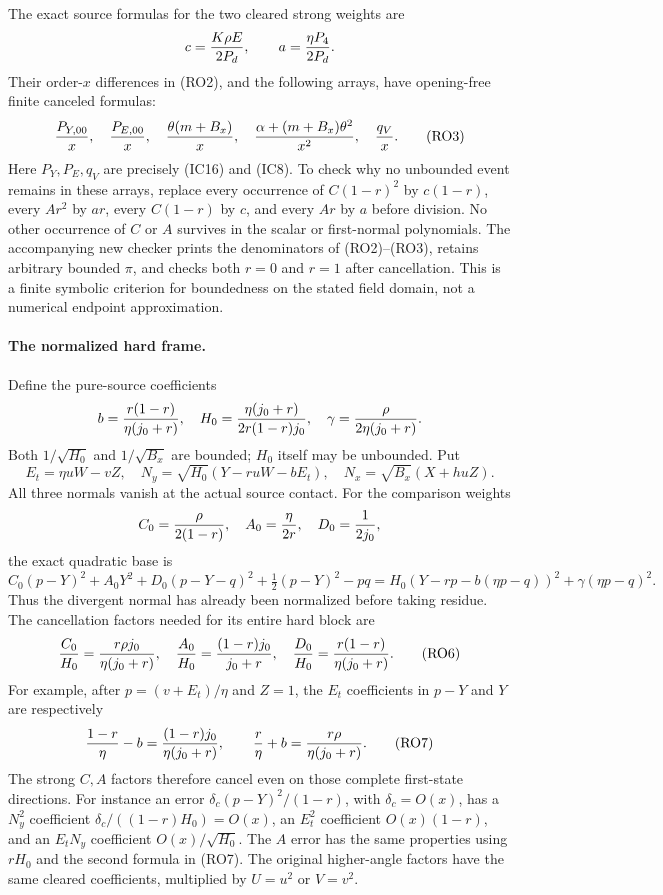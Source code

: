 The exact source formulas for the two cleared strong weights are
\[
 c={K\rho E\over2P_d},\qquad a={\eta P_4\over2P_d}.
\]
Their order-$x$ differences in (RO2), and the following arrays, have
opening-free finite canceled formulas:
\[
 {P_{Y,00}\over x},\quad {P_{E,00}\over x},\quad
 {\theta(m+B_x)\over x},\quad
 {\alpha+(m+B_x)\theta^2\over x^2},\quad {q_V\over x}.
                                                               \tag{RO3}
\]
Here $P_Y,P_E,q_V$ are precisely (IC16) and (IC8). To check why no
unbounded event remains in these arrays, replace every occurrence of
$C(1-r)^2$ by $c(1-r)$, every $Ar^2$ by $ar$, every
$C(1-r)$ by $c$, and every $Ar$ by $a$ before division. No other
occurrence of $C$ or $A$ survives in the scalar or first-normal
polynomials. The accompanying new checker prints the denominators of
(RO2)--(RO3), retains arbitrary bounded $\pi$, and checks both
$r=0$ and $r=1$ after cancellation. This is a finite symbolic
criterion for boundedness on the stated field domain, not a numerical
endpoint approximation.

\paragraph{The normalized hard frame.}
Define the pure-source coefficients
\[
 b={r(1-r)\over\eta(j_0+r)},\quad
 H_0={\eta(j_0+r)\over2r(1-r)j_0},\quad
 \gamma={\rho\over2\eta(j_0+r)}.
\]
Both $1/\sqrt{H_0}$ and $1/\sqrt{B_x}$ are bounded; $H_0$
itself may be unbounded. Put
\[
 E_t=\eta uW-vZ,\quad
 N_y=\sqrt{H_0}(Y-ruW-bE_t),\quad
 N_x=\sqrt{B_x}(X+huZ).                              \tag{RO4}
\]
All three normals vanish at the actual source contact. For the
comparison weights
\[
 C_0={\rho\over2(1-r)},\quad A_0={\eta\over2r},\quad
 D_0={1\over2j_0},
\]
the exact quadratic base is
\[
 C_0(p-Y)^2+A_0Y^2+D_0(p-Y-q)^2+\tfrac12(p-Y)^2-pq
       =H_0(Y-rp-b(\eta p-q))^2+\gamma(\eta p-q)^2.  \tag{RO5}
\]
Thus the divergent normal has already been normalized before taking
residue. The cancellation factors needed for its entire hard block are
\[
 {C_0\over H_0}={r\rho j_0\over\eta(j_0+r)},\quad
 {A_0\over H_0}={(1-r)j_0\over j_0+r},\quad
 {D_0\over H_0}={r(1-r)\over\eta(j_0+r)}.             \tag{RO6}
\]
For example, after $p=(v+E_t)/\eta$ and $Z=1$, the $E_t$
coefficients in $p-Y$ and $Y$ are respectively
\[
 {1-r\over\eta}-b={(1-r)j_0\over\eta(j_0+r)},\qquad
 {r\over\eta}+b={r\rho\over\eta(j_0+r)}.            \tag{RO7}
\]
The strong $C,A$ factors therefore cancel even on those complete
first-state directions. For instance an error
$\delta_c(p-Y)^2/(1-r)$, with $\delta_c=O(x)$, has a
$N_y^2$ coefficient $\delta_c/((1-r)H_0)=O(x)$,
an $E_t^2$ coefficient $O(x)(1-r)$, and an $E_tN_y$
coefficient $O(x)/\sqrt{H_0}$. The $A$ error has the same
properties using $rH_0$ and the second formula in (RO7).
The original higher-angle factors have the same cleared coefficients,
multiplied by $U=u^2$ or $V=v^2$.

